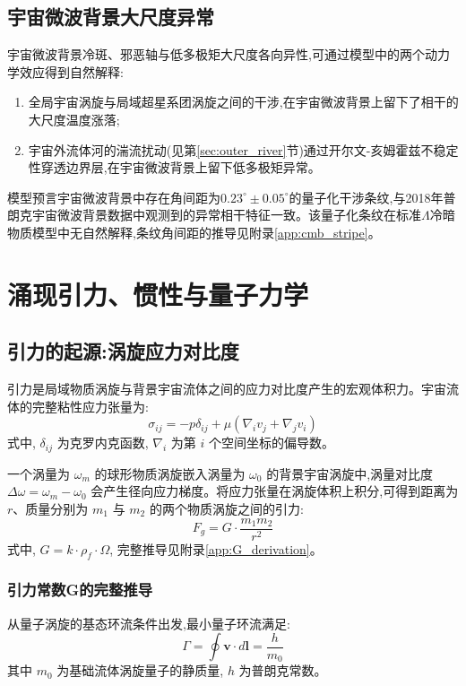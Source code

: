 \documentclass[11pt,a4paper]{article}
\def\grad{\nabla}
\begin{document}
\subsection{宇宙微波背景大尺度异常}
宇宙微波背景冷斑、邪恶轴与低多极矩大尺度各向异性,可通过模型中的两个动力学效应得到自然解释:
\begin{enumerate}
\item 全局宇宙涡旋与局域超星系团涡旋之间的干涉,在宇宙微波背景上留下了相干的大尺度温度涨落;
\item 宇宙外流体河的湍流扰动(见第\ref{sec:outer_river}节)通过开尔文-亥姆霍兹不稳定性穿透边界层,在宇宙微波背景上留下低多极矩异常。
\end{enumerate}

模型预言宇宙微波背景中存在角间距为$0.23^\circ\pm0.05^\circ$的量子化干涉条纹,与2018年普朗克宇宙微波背景数据中观测到的异常相干特征一致\cite{planck2019vi}。该量子化条纹在标准$\Lambda$冷暗物质模型中无自然解释,条纹角间距的推导见附录\ref{app:cmb_stripe}。

\section{涌现引力、惯性与量子力学}
\label{sec:gravity_origin}
\subsection{引力的起源:涡旋应力对比度}
引力是局域物质涡旋与背景宇宙流体之间的应力对比度产生的宏观体积力。宇宙流体的完整粘性应力张量为:
\begin{equation}
\sigma_{ij} = -p \delta_{ij} + \mu \left( \grad_i v_j + \grad_j v_i \right)
\end{equation}
式中, $\delta_{ij}$ 为克罗内克函数, $\grad_i$ 为第 $i$ 个空间坐标的偏导数。

一个涡量为 $\omega_m$ 的球形物质涡旋嵌入涡量为 $\omega_0$ 的背景宇宙涡旋中,涡量对比度 $\Delta\omega = \omega_m - \omega_0$ 会产生径向应力梯度。将应力张量在涡旋体积上积分,可得到距离为 $r$、质量分别为 $m_1$ 与 $m_2$ 的两个物质涡旋之间的引力:
\begin{equation}
F_g = G \cdot \frac{m_1 m_2}{r^2}
\end{equation}
式中, $G = k \cdot \rho_f \cdot \Omega$, 完整推导见附录\ref{app:G_derivation}。

\subsubsection{引力常数G的完整推导}
从量子涡旋的基态环流条件出发,最小量子环流满足:
\begin{equation}
\Gamma = \oint \boldsymbol{v} \cdot d\boldsymbol{l} = \frac{h}{m_0}
\end{equation}
其中 $m_0$ 为基础流体涡旋量子的静质量, $h$ 为普朗克常数。
\end{document}
